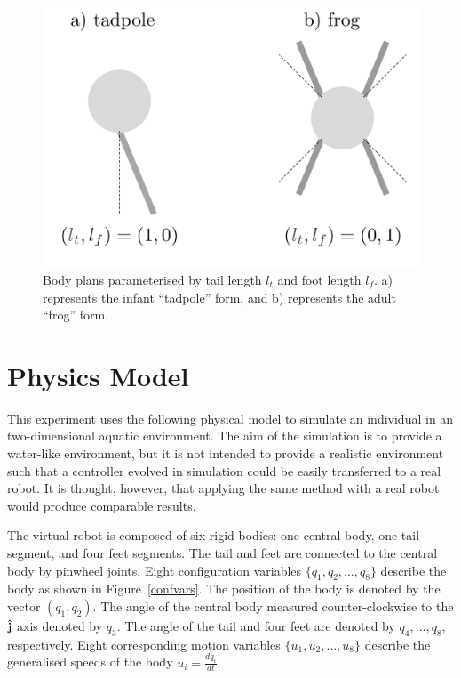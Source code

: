 \begin{figure}[h]
  \centering
  \includegraphics[scale=0.4]{fig/forms-gs.pdf} 
  \vspace{-30pt}
  \caption[Body plans]{\label{morphology}Body plans parameterised by
    tail length $l_t$ and foot length $l_f$. a) represents the infant
    ``tadpole'' form, and b) represents the adult ``frog'' form. }
\end{figure}

\section{Physics Model}

This experiment uses the following physical model to simulate an
individual in an two-dimensional aquatic environment.  The aim of the
simulation is to provide a water-like environment, but it is not
intended to provide a realistic environment such that a controller
evolved in simulation could be easily transferred to a real robot.  It
is thought, however, that applying the same method with a real robot
would produce comparable results.

The virtual robot is composed of six rigid bodies: one central body,
one tail segment, and four feet segments.  The tail and feet are
connected to the central body by pinwheel joints.  Eight configuration
variables $\{q_1, q_2, \ldots, q_8\}$ describe the body as shown in
Figure~\ref{confvars}.  The position of the body is denoted by the
vector $(q_1, q_2)$.  The angle of the central body measured
counter-clockwise to the $\bf \hat j$ axis denoted by $q_3$.  The
angle of the tail and four feet are denoted by $q_4, \ldots, q_8$,
respectively.  Eight corresponding motion variables $\{u_1, u_2,
\ldots, u_8\}$ describe the generalised speeds of the body $u_i =
\frac{d q_i}{d t}$.

